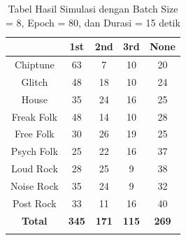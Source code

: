 \begin{longtable}[c]{|c|c|c|c|c|}
	\hline
	\textbf{}      & \textbf{1st} & \textbf{2nd} & \textbf{3rd} & \textbf{None} \\ \hline
	\endfirsthead
	\endhead
	Chiptune       & 63           & 7            & 10           & 20            \\ \hline
	Glitch         & 48           & 18           & 10           & 24            \\ \hline
	House          & 35           & 24           & 16           & 25            \\ \hline
	Freak Folk     & 48           & 14           & 10           & 28            \\ \hline
	Free Folk      & 30           & 26           & 19           & 25            \\ \hline
	Psych Folk     & 25           & 22           & 16           & 37            \\ \hline
	Loud Rock      & 28           & 25           & 9            & 38            \\ \hline
	Noise Rock     & 35           & 24           & 9            & 32            \\ \hline
	Post Rock      & 33           & 11           & 16           & 40            \\ \hline
	\textbf{Total} & \textbf{345} & \textbf{171} & \textbf{115} & \textbf{269}  \\ \hline
	\caption{Tabel Hasil Simulasi dengan Batch Size = 8, Epoch = 80, dan Durasi = 15 detik}
	\label{tab:my-table}\\
\end{longtable}

